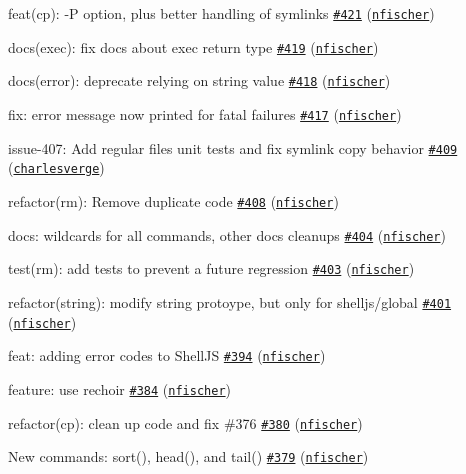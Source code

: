 \begin{DoxyItemize}
\item feat(cp)\+: -\/P option, plus better handling of symlinks \href{https://github.com/shelljs/shelljs/pull/421}{\tt \#421} (\href{https://github.com/nfischer}{\tt nfischer})
\item docs(exec)\+: fix docs about exec return type \href{https://github.com/shelljs/shelljs/pull/419}{\tt \#419} (\href{https://github.com/nfischer}{\tt nfischer})
\item docs(error)\+: deprecate relying on string value \href{https://github.com/shelljs/shelljs/pull/418}{\tt \#418} (\href{https://github.com/nfischer}{\tt nfischer})
\item fix\+: error message now printed for fatal failures \href{https://github.com/shelljs/shelljs/pull/417}{\tt \#417} (\href{https://github.com/nfischer}{\tt nfischer})
\item issue-\/407\+: Add regular files unit tests and fix symlink copy behavior \href{https://github.com/shelljs/shelljs/pull/409}{\tt \#409} (\href{https://github.com/charlesverge}{\tt charlesverge})
\item refactor(rm)\+: Remove duplicate code \href{https://github.com/shelljs/shelljs/pull/408}{\tt \#408} (\href{https://github.com/nfischer}{\tt nfischer})
\item docs\+: wildcards for all commands, other docs cleanups \href{https://github.com/shelljs/shelljs/pull/404}{\tt \#404} (\href{https://github.com/nfischer}{\tt nfischer})
\item test(rm)\+: add tests to prevent a future regression \href{https://github.com/shelljs/shelljs/pull/403}{\tt \#403} (\href{https://github.com/nfischer}{\tt nfischer})
\item refactor(string)\+: modify string protoype, but only for shelljs/global \href{https://github.com/shelljs/shelljs/pull/401}{\tt \#401} (\href{https://github.com/nfischer}{\tt nfischer})
\item feat\+: adding error codes to Shell\+JS \href{https://github.com/shelljs/shelljs/pull/394}{\tt \#394} (\href{https://github.com/nfischer}{\tt nfischer})
\item feature\+: use rechoir \href{https://github.com/shelljs/shelljs/pull/384}{\tt \#384} (\href{https://github.com/nfischer}{\tt nfischer})
\item refactor(cp)\+: clean up code and fix \#376 \href{https://github.com/shelljs/shelljs/pull/380}{\tt \#380} (\href{https://github.com/nfischer}{\tt nfischer})
\item New commands\+: sort(), head(), and tail() \href{https://github.com/shelljs/shelljs/pull/379}{\tt \#379} (\href{https://github.com/nfischer}{\tt nfischer})

\end{DoxyItemize}
